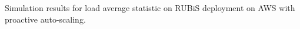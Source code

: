 \label{proactive} Simulation results for load average statistic on RUBiS deployment on AWS with proactive auto-scaling.